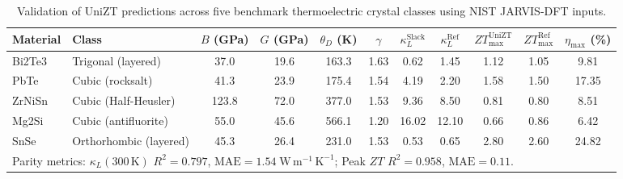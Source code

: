 \begin{table}[htbp]
\centering
\caption{Validation of UniZT predictions across five benchmark thermoelectric crystal classes using NIST JARVIS-DFT inputs.}
\label{tab:unizt_benchmark}
\begin{tabular}{llccccccccc}
\toprule
Material & Class & $B$ (GPa) & $G$ (GPa) & $\theta_D$ (K) & $\gamma$ & $\kappa_L^{\mathrm{Slack}}$ & $\kappa_L^{\mathrm{Ref}}$ & $ZT_{\max}^{\mathrm{UniZT}}$ & $ZT_{\max}^{\mathrm{Ref}}$ & $\eta_{\max}$ (\%) \\
\midrule
Bi2Te3 & Trigonal (layered) & 37.0 & 19.6 & 163.3 & 1.63 & 0.62 & 1.45 & 1.12 & 1.05 & 9.81 \\
PbTe & Cubic (rocksalt) & 41.3 & 23.9 & 175.4 & 1.54 & 4.19 & 2.20 & 1.58 & 1.50 & 17.35 \\
ZrNiSn & Cubic (Half-Heusler) & 123.8 & 72.0 & 377.0 & 1.53 & 9.36 & 8.50 & 0.81 & 0.80 & 8.51 \\
Mg2Si & Cubic (antifluorite) & 55.0 & 45.6 & 566.1 & 1.20 & 16.02 & 12.10 & 0.66 & 0.86 & 6.42 \\
SnSe & Orthorhombic (layered) & 45.3 & 26.4 & 231.0 & 1.53 & 0.53 & 0.65 & 2.80 & 2.60 & 24.82 \\
\midrule
\multicolumn{11}{l}{Parity metrics: $\kappa_L(300\,\mathrm{K})$ $R^2=0.797$, $\mathrm{MAE}=1.54\;\mathrm{W\,m^{-1}\,K^{-1}}$; Peak $ZT$ $R^2=0.958$, $\mathrm{MAE}=0.11$.} \\
\bottomrule
\end{tabular}
\end{table}
